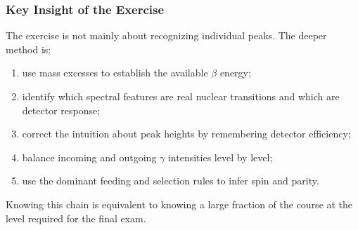 \subsubsection*{Key Insight of the Exercise}
The exercise is not mainly about recognizing individual peaks. The deeper method
is:
\begin{enumerate}[label=(\roman*),nosep]
  \item use mass excesses to establish the available $\beta$ energy;
  \item identify which spectral features are real nuclear transitions and which
        are detector response;
  \item correct the intuition about peak heights by remembering detector
        efficiency;
  \item balance incoming and outgoing $\gamma$ intensities level by level;
  \item use the dominant feeding and selection rules to infer spin and parity.
\end{enumerate}
Knowing this chain is equivalent to knowing a large fraction of the course at
the level required for the final exam.
